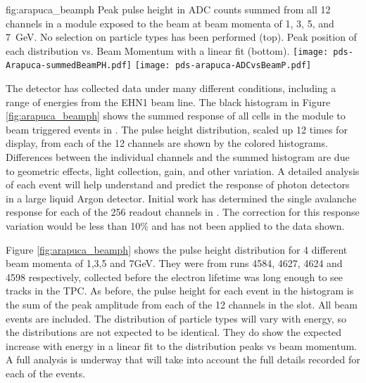 \begin{dunefigure}{fig:arapuca_beamph}
{Peak pulse height in ADC counts summed from all 12 channels in a   module exposed to the beam at beam momenta of \num{1}, \num{3}, \num{5}, and \SI{7}{GeV}. No selection on particle types has been performed (top).  Peak position of each distribution vs. Beam Momentum with a linear fit (bottom). }
\texttt{[image: pds-Arapuca-summedBeamPH.pdf]}
\texttt{[image: pds-arapuca-ADCvsBeamP.pdf]}
\end{dunefigure}
The detector has collected data under many different conditions, including a range of energies from the EHN1 beam line.  The black histogram in Figure \ref{fig:arapuca_beamph} shows the summed response of all  cells in the module to beam triggered events in .  The pulse height distribution, scaled up \num{12} times for display, from each of the \num{12} channels are shown by the colored histograms.  Differences between the individual channels and the summed histogram are due to geometric effects, light collection, gain, and other variation.  A detailed analysis of each event will help understand and predict the response of photon detectors in a large liquid Argon detector.
Initial work has determined the single avalanche response for each of the \num{256} readout channels in . The correction for this response variation would be less than 10\% and has not been applied to the data shown.

Figure \ref{fig:arapuca_beamph} shows the pulse height distribution for 4 different beam momenta of \num{1},\num{3},\num{5} and \num{7}{GeV}.
They were from runs \num{4584}, \num{4627}, \num{4624} and \num{4598} respectively, collected before the electron lifetime was long enough to see tracks in the TPC.  As before, the pulse height for each event in the histogram is the sum of the peak amplitude from each of the \num{12}  channels in the slot.  All beam events are included. The distribution of particle types will vary with energy, so the distributions are not expected to be identical.  They do show the expected increase with energy in a linear fit to the distribution peaks vs beam momentum.  A full analysis is underway that will take into account the full details recorded for each of the events.  
 

